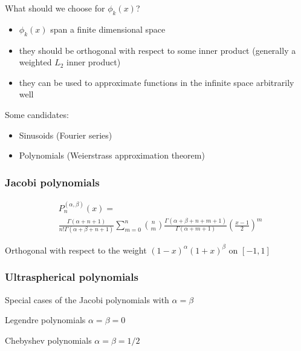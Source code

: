 \documentclass{beamer}
\begin{document}
\begin{frame}

What should we choose for $\phi_k(x)$?
\begin{itemize}
\item $\phi_k(x)$ span a finite dimensional space
\item they should be orthogonal with respect to some inner product (generally a weighted $L_2$ inner product)
\item they can be used to approximate functions in the infinite space arbitrarily well
\end{itemize}

Some candidates:
\begin{itemize}
\item Sinusoids (Fourier series)
\item Polynomials (Weierstrass approximation theorem)
\end{itemize}

\end{frame}

\begin{frame}

\frametitle{Jacobi polynomials}

\begin{align*}
& P_n^{(\alpha, \beta)}(x) = \\
& \frac{\Gamma(\alpha + n + 1)}{n! \Gamma(\alpha + \beta + n + 1)} \sum_{m=0}^n \binom{n}{m} \frac{\Gamma(\alpha + \beta + n + m + 1)}{\Gamma(\alpha + m + 1)} \left ( \frac{x-1}{2} \right )^m
\end{align*}

Orthogonal with respect to the weight $(1-x)^\alpha (1+x)^\beta$ on $[-1,1]$

\end{frame}

\begin{frame}

\frametitle{Ultraspherical polynomials}

Special cases of the Jacobi polynomials with $\alpha = \beta$

\begin{block}{Legendre polynomials}
$\alpha = \beta = 0$
\end{block}

\begin{block}{Chebyshev polynomials}
$\alpha = \beta = 1/2$
\end{block}

\end{frame}
\end{document}
